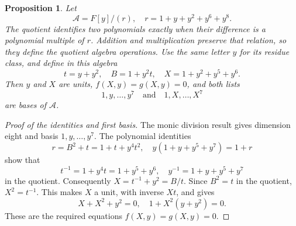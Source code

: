 \documentclass{article}
\newtheorem{proposition}{Proposition}
\begin{document}
\begin{proposition}\label{prop:charge-algebra}
  Let
  \begin{equation}
    \mathcal{A} = F[y]/(r), \quad r = 1 + y + y^2 + y^6 + y^8.
  \end{equation}
  The quotient identifies two polynomials exactly when their difference is a polynomial
  multiple of \(r\). Addition and multiplication preserve that relation, so they define the
  quotient algebra operations. Use the same letter \(y\) for its residue class, and define in
  this algebra
  \begin{equation}
    t = y + y^2, \quad B = 1 + y^2 t, \quad
    X = 1 + y^2 + y^5 + y^6.
  \end{equation}
  Then \(y\) and \(X\) are units, \(f(X,y) = g(X,y) = 0\), and both lists
  \begin{equation}
    1, y, \dots, y^7 \quad \text{and} \quad 1, X, \dots, X^7
  \end{equation}
  are bases of \(\mathcal{A}\).
\end{proposition}

\begin{proof}[Proof of the identities and first basis]
  The monic division result gives dimension eight and basis \(1, y, \dots, y^7\). The
  polynomial identities
  \begin{equation}
    r = B^2 + t = 1 + t + y^4 t^2,
    \quad y(1 + y + y^5 + y^7) = 1 + r
  \end{equation}
  show that
  \begin{equation}
    t^{-1} = 1 + y^4 t = 1 + y^5 + y^6,
    \quad y^{-1} = 1 + y + y^5 + y^7
  \end{equation}
  in the quotient. Consequently \(X = t^{-1} + y^2 = B/t\). Since \(B^2 = t\) in the quotient,
  \(X^2 = t^{-1}\). This makes \(X\) a unit, with inverse \(Xt\), and gives
  \begin{equation}
    X + X^2 + y^2 = 0, \quad 1 + X^2(y + y^2) = 0.
  \end{equation}
  These are the required equations \(f(X,y) = g(X,y) = 0\).
\end{proof}
\end{document}

